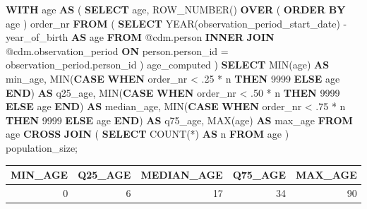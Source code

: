 \documentclass[]{book}
\newenvironment{Shaded}{\begin{snugshade}}{\end{snugshade}}
\newcommand{\KeywordTok}[1]{\textcolor[rgb]{0.13,0.29,0.53}{\textbf{#1}}}
\newcommand{\DataTypeTok}[1]{\textcolor[rgb]{0.13,0.29,0.53}{#1}}
\newcommand{\DecValTok}[1]{\textcolor[rgb]{0.00,0.00,0.81}{#1}}
\newcommand{\FunctionTok}[1]{\textcolor[rgb]{0.00,0.00,0.00}{#1}}
\newcommand{\NormalTok}[1]{#1}
\begin{document}
\begin{Shaded}
\begin{Highlighting}[]
\KeywordTok{WITH}\NormalTok{ age}
\KeywordTok{AS}\NormalTok{ (}
    \KeywordTok{SELECT}\NormalTok{ age,}
        \FunctionTok{ROW_NUMBER}\NormalTok{() }\KeywordTok{OVER}\NormalTok{ (}
            \KeywordTok{ORDER} \KeywordTok{BY}\NormalTok{ age}
\NormalTok{            ) order_nr}
    \KeywordTok{FROM}\NormalTok{ (}
        \KeywordTok{SELECT} \DataTypeTok{YEAR}\NormalTok{(observation_period_start_date) - year_of_birth }\KeywordTok{AS}\NormalTok{ age}
        \KeywordTok{FROM}\NormalTok{ @cdm.person}
        \KeywordTok{INNER} \KeywordTok{JOIN}\NormalTok{ @cdm.observation_period}
            \KeywordTok{ON}\NormalTok{ person.person_id = observation_period.person_id}
\NormalTok{        ) age_computed}
\NormalTok{    )}
\KeywordTok{SELECT} \FunctionTok{MIN}\NormalTok{(age) }\KeywordTok{AS}\NormalTok{ min_age,}
    \FunctionTok{MIN}\NormalTok{(}\KeywordTok{CASE} 
            \KeywordTok{WHEN}\NormalTok{ order_nr < .}\DecValTok{25}\NormalTok{ * n}
                \KeywordTok{THEN} \DecValTok{9999}
            \KeywordTok{ELSE}\NormalTok{ age}
            \KeywordTok{END}\NormalTok{) }\KeywordTok{AS}\NormalTok{ q25_age,}
    \FunctionTok{MIN}\NormalTok{(}\KeywordTok{CASE} 
            \KeywordTok{WHEN}\NormalTok{ order_nr < .}\DecValTok{50}\NormalTok{ * n}
                \KeywordTok{THEN} \DecValTok{9999}
            \KeywordTok{ELSE}\NormalTok{ age}
            \KeywordTok{END}\NormalTok{) }\KeywordTok{AS}\NormalTok{ median_age,}
    \FunctionTok{MIN}\NormalTok{(}\KeywordTok{CASE} 
            \KeywordTok{WHEN}\NormalTok{ order_nr < .}\DecValTok{75}\NormalTok{ * n}
                \KeywordTok{THEN} \DecValTok{9999}
            \KeywordTok{ELSE}\NormalTok{ age}
            \KeywordTok{END}\NormalTok{) }\KeywordTok{AS}\NormalTok{ q75_age,}
    \FunctionTok{MAX}\NormalTok{(age) }\KeywordTok{AS}\NormalTok{ max_age}
\KeywordTok{FROM}\NormalTok{ age}
\KeywordTok{CROSS} \KeywordTok{JOIN}\NormalTok{ (}
    \KeywordTok{SELECT} \FunctionTok{COUNT}\NormalTok{(*) }\KeywordTok{AS}\NormalTok{ n}
    \KeywordTok{FROM}\NormalTok{ age}
\NormalTok{    ) population_size;}
\end{Highlighting}
\end{Shaded}

\begin{longtable}[]{@{}rrrrr@{}}
\toprule
MIN\_AGE & Q25\_AGE & MEDIAN\_AGE & Q75\_AGE & MAX\_AGE\tabularnewline
\midrule
\endhead
0 & 6 & 17 & 34 & 90\tabularnewline
\bottomrule
\end{longtable}
\end{document}
